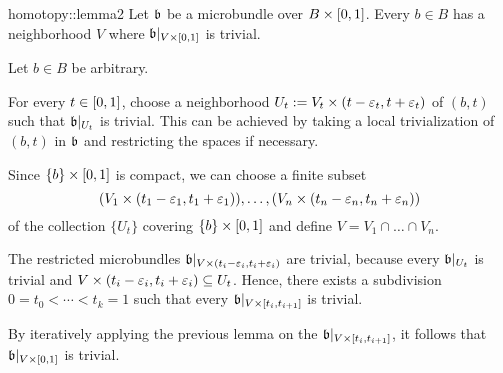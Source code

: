 \begin{mylemma}{homotopy::lemma2}{}
    Let $\mathfrak{b}$ be a microbundle over $B \times{} [0, 1]$.
    Every $b \in B$ has a neighborhood $V$ where $\mathfrak{b}\vert_{V \times{} [0, 1]}$ is trivial.
\end{mylemma}

\begin{myproof}
    Let $b \in B$ be arbitrary.

    For every $t \in [0, 1]$, choose a neighborhood $U_t := V_t \times (t - \varepsilon{}_t, t + \varepsilon{}_t)$ of $(b, t)$ such that $\mathfrak{b}\vert_{U_t}$ is trivial.
    This can be achieved by taking a local trivialization of $(b, t)$ in $\mathfrak{b}$ and restricting the spaces if necessary.

    Since $\{b\} \times{} [0, 1]$ is compact, we can choose a finite subset
    \[ (V_1 \times (t_1 - \varepsilon{}_1, t_1 + \varepsilon{}_1)), \dots, (V_n \times (t_n - \varepsilon{}_n, t_n + \varepsilon{}_n)) \]
    of the collection $\{U_t\}$ covering $\{b\} \times [0, 1]$ and define $V = V_1 \cap \dots \cap V_n$.

    The restricted microbundles $\mathfrak{b}\vert_{V \times (t_i - \varepsilon{}_i, t_i + \varepsilon{}_i)}$ are trivial, because every $\mathfrak{b}\vert_{U_t}$ is trivial and $V \times (t_i - \varepsilon{}_i, t_i + \varepsilon{}_i) \subseteq{} U_t$.
    Hence, there exists a subdivision $0 = t_0 < \cdots < t_k = 1$ such that every $\mathfrak{b}\vert_{V \times [t_{i}, t_{i + 1}]}$ is trivial.
    
    By iteratively applying the previous lemma on the $\mathfrak{b}\vert_{V \times [t_i, t_{i + 1}]}$, it follows that $\mathfrak{b}\vert_{V \times{} [0, 1]}$ is trivial.
\end{myproof}